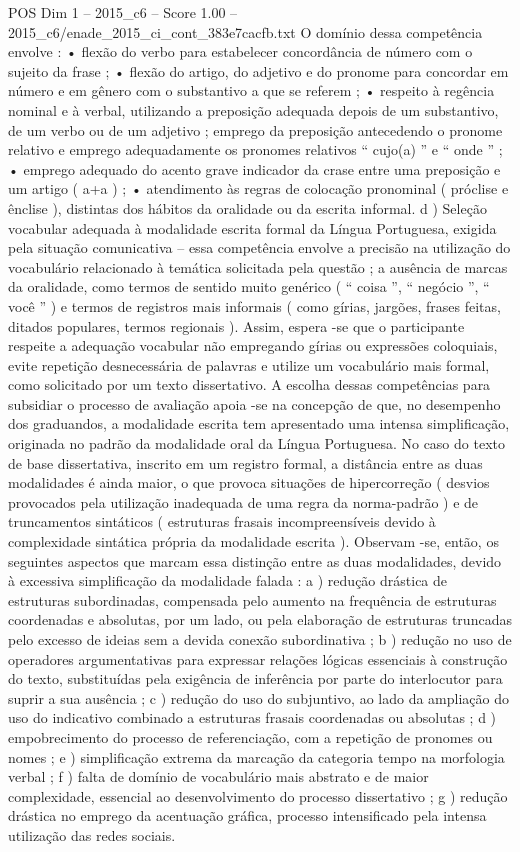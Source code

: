 \begin{textsample}{POS Dim 1 – 2015\_c6 – Score 1.00 – 2015\_c6/enade\_2015\_ci\_cont\_383e7cacfb.txt}
O domínio dessa competência envolve : • flexão do verbo para estabelecer concordância de número com o sujeito da frase ; • flexão do artigo, do adjetivo e do pronome para concordar em número e em gênero com o substantivo a que se referem ; • respeito à regência nominal e à verbal, utilizando a preposição adequada depois de um substantivo, de um verbo ou de um adjetivo ; emprego da preposição antecedendo o pronome relativo e emprego adequadamente os pronomes relativos “ cujo(a) ” e “ onde ” ; • emprego adequado do acento grave indicador da crase entre uma preposição e um artigo ( a+a ) ; • atendimento às regras de colocação pronominal ( próclise e ênclise ), distintas dos hábitos da oralidade ou da escrita informal. d ) Seleção vocabular adequada à modalidade escrita formal da Língua Portuguesa, exigida pela situação comunicativa – essa competência envolve a precisão na utilização do vocabulário relacionado à temática solicitada pela questão ; a ausência de marcas da oralidade, como termos de sentido muito genérico ( “ coisa ”, “ negócio ”, “ você ” ) e termos de registros mais informais ( como gírias, jargões, frases feitas, ditados populares, termos regionais ).
Assim, espera -se que o participante respeite a adequação vocabular não empregando gírias ou expressões coloquiais, evite repetição desnecessária de palavras e utilize um vocabulário mais formal, como solicitado por um texto dissertativo.
A escolha dessas competências para subsidiar o processo de avaliação apoia -se na concepção de que, no desempenho dos graduandos, a modalidade escrita tem apresentado uma intensa simplificação, originada no padrão da modalidade oral da Língua Portuguesa.
No caso do texto de base dissertativa, inscrito em um registro formal, a distância entre as duas modalidades é ainda maior, o que provoca situações de hipercorreção ( desvios provocados pela utilização inadequada de uma regra da norma-padrão ) e de truncamentos sintáticos ( estruturas frasais incompreensíveis devido à complexidade sintática própria da modalidade escrita ).
Observam -se, então, os seguintes aspectos que marcam essa distinção entre as duas modalidades, devido à excessiva simplificação da modalidade falada : a ) redução drástica de estruturas subordinadas, compensada pelo aumento na frequência de estruturas coordenadas e absolutas, por um lado, ou pela elaboração de estruturas truncadas pelo excesso de ideias sem a devida conexão subordinativa ; b ) redução no uso de operadores argumentativas para expressar relações lógicas essenciais à construção do texto, substituídas pela exigência de inferência por parte do interlocutor para suprir a sua ausência ; c ) redução do uso do subjuntivo, ao lado da ampliação do uso do indicativo combinado a estruturas frasais coordenadas ou absolutas ; d ) empobrecimento do processo de referenciação, com a repetição de pronomes ou nomes ; e ) simplificação extrema da marcação da categoria tempo na morfologia verbal ; f ) falta de domínio de vocabulário mais abstrato e de maior complexidade, essencial ao desenvolvimento do processo dissertativo ; g ) redução drástica no emprego da acentuação gráfica, processo intensificado pela intensa utilização das redes sociais.

\end{textsample}

